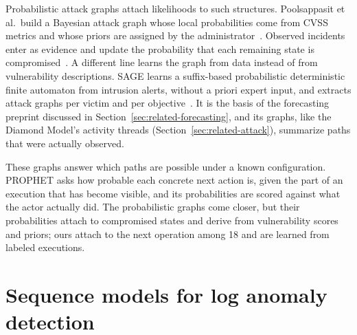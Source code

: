 Probabilistic attack graphs attach likelihoods to such structures.
Poolsappasit et al.\ build a Bayesian attack graph whose local
probabilities come from CVSS metrics and whose priors are assigned by
the administrator~\cite{poolsappasit2012dynamic}.
Observed incidents enter as evidence and update the probability that
each remaining state is compromised~\cite{poolsappasit2012dynamic}.
A different line learns the graph from data instead of from
vulnerability descriptions. SAGE learns a suffix-based probabilistic
deterministic finite automaton from intrusion alerts, without a priori
expert input, and extracts attack graphs per victim and per
objective~\cite{nadeem2022alert}. It is the basis of the forecasting
preprint discussed in Section~\ref{sec:related-forecasting}, and its
graphs, like the Diamond Model's activity threads
(Section~\ref{sec:related-attack}), summarize paths that were actually
observed.

These graphs answer which paths are possible under a known
configuration. PROPHET asks how probable each concrete next action is,
given the part of an execution that has become visible, and its
probabilities are scored against what the actor actually did. The
probabilistic graphs come closer, but their probabilities attach to
compromised states and derive from vulnerability scores and priors;
ours attach to the next operation among 18 and are learned from
labeled executions.
\section{Sequence models for log anomaly detection}
\label{sec:related-sequence}

